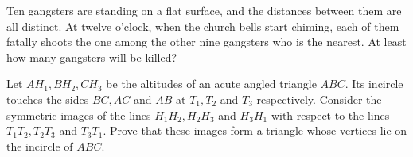 \item[\textbf{G7.}]Ten gangsters are standing on a flat surface, and the distances between them are all distinct. At twelve o’clock, when the church bells start chiming, each of them fatally shoots the one among the other nine gangsters who is the nearest. At least how many gangsters will be killed?

\item[\textbf{G8.}]Let $ AH_1, BH_2, CH_3$ be the altitudes of an acute angled triangle $ ABC$. Its incircle touches the sides $ BC, AC$ and $ AB$ at $ T_1, T_2$ and $ T_3$ respectively. Consider the symmetric images  of  the  lines $ H_1H_2, H_2H_3$ and $ H_3H_1$ with  respect  to  the  lines $ T_1T_2, T_2T_3$ and $ T_3T_1$.  Prove  that  these  images  form a  triangle  whose  vertices  lie  on  the incircle of $ ABC$.